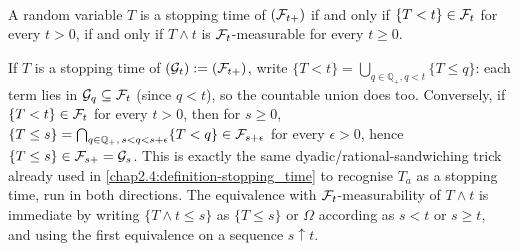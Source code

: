 \begin{proposition} \label{chap3.2:proposition-stopping_time_of_right_cont_filtration}  \\
A random variable $T$ is a stopping time of $(\mathcal{F}_{t+})$ if and only if $\{T<t\}\in\mathcal{F}_t$ for every $t>0$, if and only if $T\wedge t$ is $\mathcal{F}_t$-measurable for every $t\ge0$.
\end{proposition}
\begin{proofidea}
If $T$ is a stopping time of $(\mathcal{G}_t):=(\mathcal{F}_{t+})$, write $\{T<t\}=\bigcup_{q\in\mathbb Q_+,q<t}\{T\le q\}$: each term lies in $\mathcal{G}_q\subseteq\mathcal{F}_t$ (since $q<t$), so the countable union does too. Conversely, if $\{T<t\}\in\mathcal{F}_t$ for every $t>0$, then for $s\ge0$, $\{T\le s\}=\bigcap_{q\in\mathbb Q_+,\,s<q<s+\epsilon}\{T<q\}\in\mathcal{F}_{s+\epsilon}$ for every $\epsilon>0$, hence $\{T\le s\}\in\mathcal{F}_{s+}=\mathcal{G}_s$. This is exactly the same dyadic/rational-sandwiching trick already used in \cref{chap2.4:definition-stopping_time} to recognise $T_a$ as a stopping time, run in both directions. The equivalence with $\mathcal{F}_t$-measurability of $T\wedge t$ is immediate by writing $\{T\wedge t\le s\}$ as $\{T\le s\}$ or $\Omega$ according as $s<t$ or $s\ge t$, and using the first equivalence on a sequence $s\uparrow t$.
\end{proofidea}


